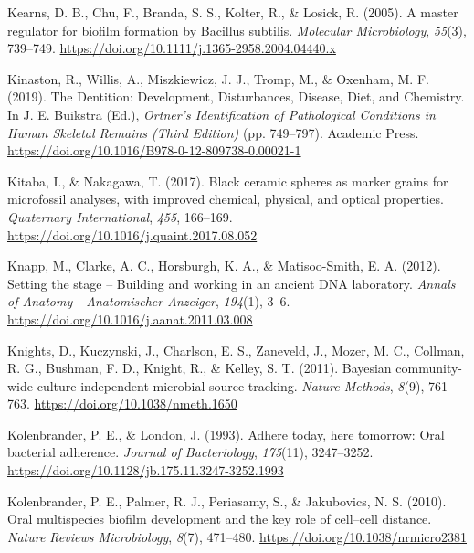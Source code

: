 \documentclass[
  letterpaper,
]{book}
\newlength{\cslhangindent}
\newlength{\cslentryspacingunit} %
\newenvironment{CSLReferences}[2] %
 {%
  \setlength{\parindent}{0pt}
  \ifodd #1
  \let\oldpar\par
  \def\par{\hangindent=\cslhangindent\oldpar}
  \fi
  \setlength{\parskip}{#2\cslentryspacingunit}
 }%
 {}
\begin{document}
\begin{CSLReferences}{1}{0}
\leavevmode{}%
Kearns, D. B., Chu, F., Branda, S. S., Kolter, R., \& Losick, R. (2005).
A master regulator for biofilm formation by {Bacillus} subtilis.
\emph{Molecular Microbiology}, \emph{55}(3), 739--749.
\url{https://doi.org/10.1111/j.1365-2958.2004.04440.x}

\leavevmode{}%
Kinaston, R., Willis, A., Miszkiewicz, J. J., Tromp, M., \& Oxenham, M.
F. (2019). The {Dentition}: {Development}, {Disturbances}, {Disease},
{Diet}, and {Chemistry}. In J. E. Buikstra (Ed.), \emph{Ortner's
{Identification} of {Pathological Conditions} in {Human Skeletal
Remains} ({Third Edition})} (pp. 749--797). {Academic Press}.
\url{https://doi.org/10.1016/B978-0-12-809738-0.00021-1}

\leavevmode{}%
Kitaba, I., \& Nakagawa, T. (2017). Black ceramic spheres as marker
grains for microfossil analyses, with improved chemical, physical, and
optical properties. \emph{Quaternary International}, \emph{455},
166--169. \url{https://doi.org/10.1016/j.quaint.2017.08.052}

\leavevmode{}%
Knapp, M., Clarke, A. C., Horsburgh, K. A., \& Matisoo-Smith, E. A.
(2012). Setting the stage -- {Building} and working in an ancient {DNA}
laboratory. \emph{Annals of Anatomy - Anatomischer Anzeiger},
\emph{194}(1), 3--6. \url{https://doi.org/10.1016/j.aanat.2011.03.008}

\leavevmode{}%
Knights, D., Kuczynski, J., Charlson, E. S., Zaneveld, J., Mozer, M. C.,
Collman, R. G., Bushman, F. D., Knight, R., \& Kelley, S. T. (2011).
Bayesian community-wide culture-independent microbial source tracking.
\emph{Nature Methods}, \emph{8}(9), 761--763.
\url{https://doi.org/10.1038/nmeth.1650}

\leavevmode{}%
Kolenbrander, P. E., \& London, J. (1993). Adhere today, here tomorrow:
Oral bacterial adherence. \emph{Journal of Bacteriology},
\emph{175}(11), 3247--3252.
\url{https://doi.org/10.1128/jb.175.11.3247-3252.1993}

\leavevmode{}%
Kolenbrander, P. E., Palmer, R. J., Periasamy, S., \& Jakubovics, N. S.
(2010). Oral multispecies biofilm development and the key role of
cell--cell distance. \emph{Nature Reviews Microbiology}, \emph{8}(7),
471--480. \url{https://doi.org/10.1038/nrmicro2381}


\end{CSLReferences}
\end{document}
